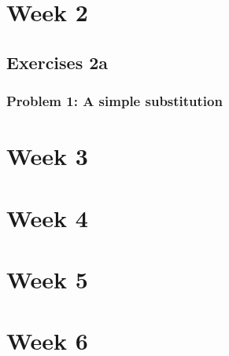 \documentclass{uva-inf-article}
\begin{document}

\section{Week 2}
\subsection{Exercises 2a}
\subsubsection{Problem 1: A simple substitution}
\section{Week 3}
\section{Week 4}
\section{Week 5}
\section{Week 6}
\end{document}

